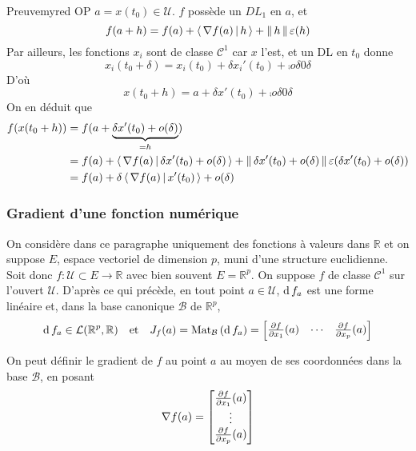     \begin{demo}{Preuve}{myred}
        OP $a = x(t_0) \in \mathcal{U}$. $f$ possède un $DL_1$ en $a$, et 
        \[ f(a+h) = f(a) + \left<\,\nabla f (a)\,\middle|\,h\,\right> + \left\lVert\,h\,\right\rVert \varepsilon(h) \]   
        Par ailleurs, les fonctions $x_i$ sont de classe $\mathcal{C}^1$ car $x$ l’est, et un DL en $t_0$ donne 
        \[ x_i(t_0 + \delta) = x_i(t_0) + \delta x_i'(t_0) + \comp{o}{\delta}{0}{\delta} \]   
        D’où
        \[ x(t_0 + h) = a + \delta x'(t_0) + \comp{o}{\delta}{0}{\delta} \]   
        On en déduit que 
        \begin{align*}
            f(x(t_0 + h)) 
            &= f(a + \underbrace{\delta x'(t_0) + o(\delta)}_{= h}) \\
            &= f(a) + \left<\,\nabla f(a)\,\middle|\,\delta x'(t_0) + o(\delta)\,\right> + \left\lVert\,\delta x'(t_0) + o(\delta)\,\right\rVert \varepsilon(\delta x'(t_0) + o(\delta)) \\
            &= f(a) + \delta \left<\,\nabla f(a)\,\middle|\,x'(t_0)\,\right> + o(\delta)
        \end{align*}
    \end{demo}

    \subsubsection{Gradient d’une fonction numérique}

    On considère dans ce paragraphe uniquement des fonctions à valeurs dans $\mathbb{R}$ et on suppose $E$, espace vectoriel de dimension $p$, muni d’une structure euclidienne. Soit donc $f : \mathcal{U} \subset E \to \mathbb{R}$ avec bien souvent $E = \mathbb{R}^p$. On suppose $f$ de classe $\mathcal{C}^1$ sur l’ouvert $\mathcal{U}$. D’après ce qui précède, en tout point $a \in \mathcal{U}$, $\operatorname{d} f_a$ est une forme linéaire et, dans la base canonique $\mathcal{B}$ de $\mathbb{R}^p$, 
    \[ \operatorname{d} f_a \in \mathcal{L}(\mathbb{R}^p,\mathbb{R}) \quad \text{et} \quad J_f(a) = \text{Mat}_{\mathcal{B}}\left(\operatorname{d} f_a\right) = \begin{bmatrix}
        \frac{\partial f}{\partial x_1}(a) & \cdots & \frac{\partial f}{\partial x_p}(a) 
    \end{bmatrix} \]   

    On peut définir le gradient de $f$ au point $a$ au moyen de ses coordonnées dans la base $\mathcal{B}$, en posant 
    \[ \nabla f(a) = \begin{bmatrix}
        \frac{\partial f}{\partial x_1}(a) \\ \vdots \\ \frac{\partial f}{\partial x_p}(a) 
    \end{bmatrix} \]   

